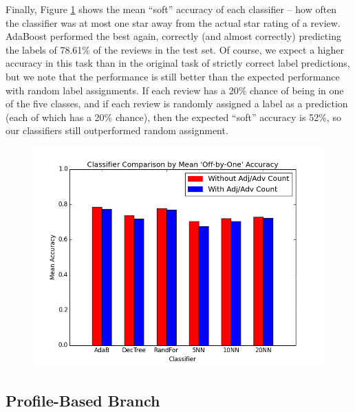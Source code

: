 Finally, Figure \ref{offbyone} shows the mean ``soft'' accuracy of each classifier -- how often the classifier was at most one star away from the actual star rating of a review. AdaBoost performed the best again, correctly (and almost correctly) predicting the labels of 78.61\% of the reviews in the test set. Of course, we expect a higher accuracy in this task than in the original task of strictly correct label predictions, but we note that the performance is still better than the expected performance with random label assignments. If each review has a 20\% chance of being in one of the five classes, and if each review is randomly assigned a label as a prediction (each of which has a 20\% chance), then the expected ``soft'' accuracy is 52\%, so our classifiers still outperformed random assignment.

\begin{figure}[!h]
\centering
\includegraphics[scale=0.5]{compoffbyone}
\caption{}
\label{offbyone}
\end{figure}

\subsection{Profile-Based Branch}